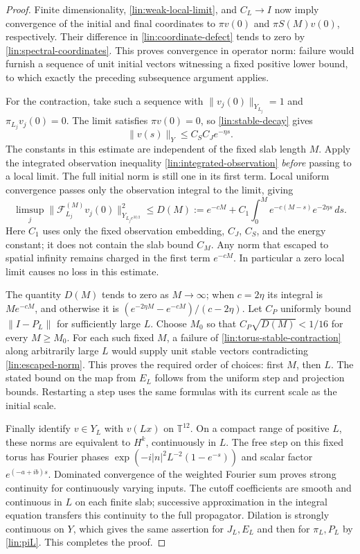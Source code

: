 \begin{proof}
Finite dimensionality, \eqref{lin:weak-local-limit}, and $C_L\to I$
now imply convergence of the initial and final coordinates to
$\pi v(0)$ and $\pi S(M)v(0)$, respectively.  Their difference in
\eqref{lin:coordinate-defect} tends to zero by
\eqref{lin:spectral-coordinates}.  This proves convergence in
operator norm: failure would furnish a sequence of unit initial
vectors witnessing a fixed positive lower bound, to which exactly
the preceding subsequence argument applies.

For the contraction, take such a sequence with
$\|v_j(0)\|_{Y_{L_j}}=1$ and $\pi_{L_j}v_j(0)=0$.  The limit satisfies
$\pi v(0)=0$, so \eqref{lin:stable-decay} gives
\[
 \|v(s)\|_Y\le C_SC_Je^{-\eta s}.
\]
The constants in this estimate are independent of the fixed slab
length $M$.  Apply the integrated observation inequality
\eqref{lin:integrated-observation} \emph{before} passing to a local
limit.  The full initial norm is still one in its first term.  Local
uniform convergence passes only the observation integral to the
limit, giving
\begin{equation}\label{lin:escaped-norm}
 \limsup_j\|\mathcal F_{L_j}^{(M)}v_j(0)\|_{Y_{L_je^{M/2}}}^2
 \le D(M):=e^{-cM}+C_1\int_0^M
                         e^{-c(M-s)}e^{-2\eta s}\,ds.
\end{equation}
Here $C_1$ uses only the fixed observation embedding, $C_J$, $C_S$,
and the energy constant; it does not contain the slab bound $C_M$.
Any norm that escaped to spatial infinity remains charged in the
first term $e^{-cM}$.  In particular a zero local limit causes no loss
in this estimate.

The quantity $D(M)$ tends to zero as $M\to\infty$; when $c=2\eta$
its integral is $Me^{-cM}$, and otherwise it is
$(e^{-2\eta M}-e^{-cM})/(c-2\eta)$.  Let $C_P$ uniformly bound
$\|I-P_L\|$ for sufficiently large $L$.  Choose $M_0$ so that
$C_P\sqrt{D(M)}<1/16$ for every $M\ge M_0$.  For each such fixed $M$,
a failure of \eqref{lin:torus-stable-contraction} along arbitrarily
large $L$ would supply unit stable vectors contradicting
\eqref{lin:escaped-norm}.  This proves the required order of choices:
first $M$, then $L$.  The stated bound on the map from $E_L$ follows
from the uniform step and projection bounds.  Restarting a step uses
the same formulas with its current scale as the initial scale.

Finally identify $v\in Y_L$ with $v(Lx)$ on $\mathbb T^{12}$.
On a compact range of positive $L$, these norms are equivalent to
$H^k$, continuously in $L$.  The free step on this fixed torus has
Fourier phases
$\exp(-i|n|^2L^{-2}(1-e^{-s}))$ and scalar factor $e^{(-a+ib)s}$.
Dominated convergence of the weighted Fourier sum proves strong
continuity for continuously varying inputs.  The cutoff coefficients
are smooth and continuous in $L$ on each finite slab; successive
approximation in the integral equation transfers this continuity to
the full propagator.  Dilation is strongly continuous on $Y$, which
gives the same assertion for $J_L,E_L$ and then for $\pi_L,P_L$ by
\eqref{lin:piL}.  This completes the proof.
\end{proof}
